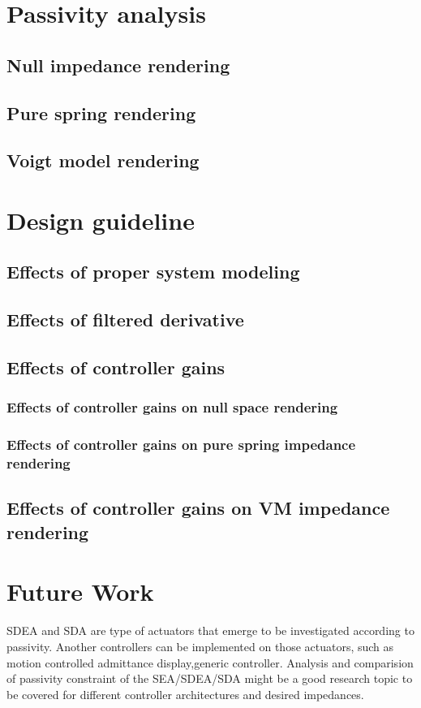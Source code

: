 \documentclass{article}
\begin{document}
\section{Passivity analysis}
\subsection{Null impedance rendering}
\subsection{Pure spring rendering}
\subsection{Voigt model rendering}
\section{Design guideline}
\subsection{Effects of proper system modeling}
\subsection{Effects of filtered derivative}
\subsection{Effects of controller gains}
\subsubsection{Effects of controller gains on null space rendering}
\subsubsection{Effects of controller gains on pure spring impedance rendering}
\subsection{Effects of controller gains on VM impedance rendering}

\section{Future Work}
SDEA and SDA are type of actuators that emerge to be investigated according to passivity. Another controllers can be implemented on those actuators, such as motion controlled admittance display,generic controller. Analysis and comparision of passivity constraint of the SEA/SDEA/SDA might be a good research topic to be covered for different controller architectures and desired impedances.
\end{document}
